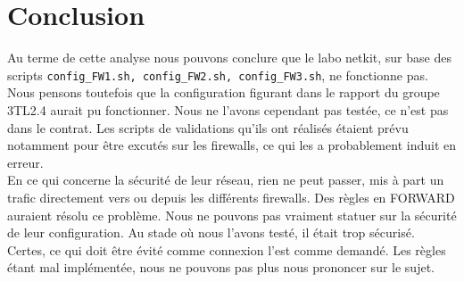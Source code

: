 \documentclass[11pt,a4paper]{article}
\begin{document}
\section{Conclusion}
Au terme de cette analyse nous pouvons conclure que le labo netkit, sur base des scripts \texttt{config\_FW1.sh, config\_FW2.sh, config\_FW3.sh}, ne fonctionne pas. Nous pensons toutefois que la configuration figurant dans le rapport du groupe 3TL2.4 aurait pu fonctionner. Nous ne l'avons cependant pas testée, ce n'est pas dans le contrat. Les scripts de validations qu'ils ont réalisés étaient prévu notamment pour être excutés sur les firewalls, ce qui les a probablement induit en erreur. \\

En ce qui concerne la sécurité de leur réseau, rien ne peut passer, mis à part un trafic directement vers ou depuis les différents firewalls. Des règles en FORWARD auraient résolu ce problème. Nous ne pouvons pas vraiment statuer sur la sécurité de leur configuration. Au stade où nous l'avons testé, il était trop sécurisé. Certes, ce qui doit être évité comme connexion l'est comme demandé. Les règles étant mal implémentée, nous ne pouvons pas plus nous prononcer sur le sujet.
\end{document}
